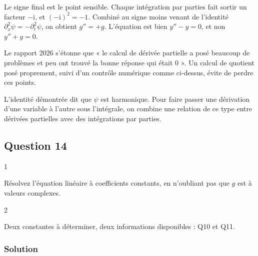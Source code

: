 \documentclass[11pt,a4paper]{article}
\begin{document}
\begin{piege}

Le signe final est le point sensible. Chaque intégration par parties fait sortir un facteur \(-\mathrm{i}\), et \((-\mathrm{i})^2=-1\). Combiné au signe moins venant de l'identité \(\partial_x^2\psi=-\partial_t^2\psi\), on obtient \(g''=+g\). L'équation est bien \(y''-y=0\), et non \(y''+y=0\).

\end{piege}

\begin{jury}

Le rapport 2026 s'étonne que « le calcul de dérivée partielle a posé beaucoup de problèmes et peu ont trouvé la bonne réponse qui était 0 ». Un calcul de quotient posé proprement, suivi d'un contrôle numérique comme ci-dessus, évite de perdre ces points.

\end{jury}

\begin{methode}

L'identité démontrée dit que \(\psi\) est harmonique. Pour faire passer une dérivation d'une variable à l'autre sous l'intégrale, on combine une relation de ce type entre dérivées partielles avec des intégrations par parties.

\end{methode}

\hypertarget{question-14}{%
\subsection{Question 14}\label{question-14}}

\begin{indication}{1}

Résolvez l'équation linéaire à coefficients constants, en n'oubliant pas que \(g\) est à valeurs complexes.

\end{indication}

\begin{indication}{2}

Deux constantes à déterminer, deux informations disponibles : Q10 et Q11.

\end{indication}

\hypertarget{solution-13}{%
\subsubsection{Solution}\label{solution-13}}
\end{document}
